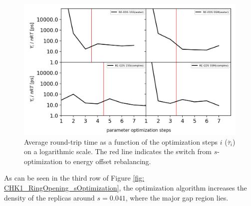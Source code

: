 \begin{figure}[h!]
\centering
\includegraphics[width=\linewidth]{fig/results/ringOpening/paramOptimization/RingOpening_optimization_RTstat.png}
\caption{Average round-trip time as a function of the optimization steps $i$ ($\overline{\tau}_i$) on a logarithmic scale. The red line indicates the switch from $s$-optimization to energy offset rebalancing.}
\label{SIfig:CHK1_RingOpening_soptimization_efficiency}
\end{figure}

As can be seen in the third row of Figure \ref{fig: CHK1_RingOpening_sOptimization}, the optimization algorithm increases the density of the replicas around $s = 0.041$, where the major gap region lies.

